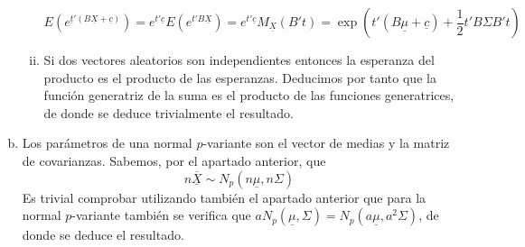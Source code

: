 \documentclass[twoside]{article}
\newcommand{\media}[1]{{\overline{#1}}}
\newcommand{\muestra}[1]{{\underline{#1}}}
\newcommand{\m}[1]{{\muestra{#1}}}
\newcommand{\mX}{{\muestra{X}}}
\begin{document}
\begin{solucion}
\begin{enumerate}[(a)]
\begin{enumerate}[i.]
\[ E\left(e^{\m{t}'(B\mX+\muestra{c})}\right) = e^{t'\muestra{c}}E\left(e^{t'B\mX}\right) = e^{t'\muestra{c}}M_\muestra{X}(B't) = \exp\left(t'(B\muestra{\mu}+\muestra{c})+\frac{1}{2}t'B\Sigma B't\right)\]
\item Si dos vectores aleatorios son independientes entonces la esperanza del producto es el producto de las esperanzas. Deducimos por tanto que la función generatriz de la suma es el producto de las funciones generatrices, de donde se deduce trivialmente el resultado.
\end{enumerate}
\newpage
\item Los parámetros de una normal $p$-variante son el vector de medias y la matriz de covarianzas. Sabemos, por el apartado anterior, que 
$$
n\media{\mX}\sim N_p(n\muestra{\mu},n\Sigma)
$$
Es trivial comprobar utilizando también el apartado anterior que para la normal $p$-variante también se verifica que $a N_p(\muestra{\mu},\Sigma)= N_p(a\muestra{\mu},a^2\Sigma)$, de donde se deduce el resultado.
\end{enumerate}
\end{solucion}
\newpage
\end{document}
